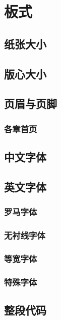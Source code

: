 \chapter{板式}
\section{纸张大小}
\section{版心大小}
\section{页眉与页脚}
\subsection{各章首页}
\section{中文字体}
\section{英文字体}
\subsection{罗马字体}
\subsection{无衬线字体}
\subsection{等宽字体}
\subsection{特殊字体}

\section{整段代码}